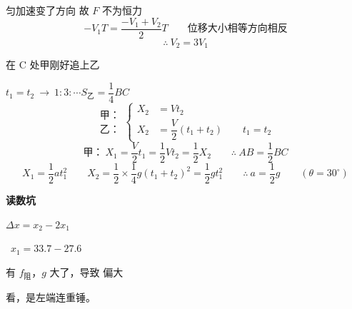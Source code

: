 匀加速\quad {}变了方向 故 $F$ 不为恒力
\[ -V_1T=\dfrac{-V_1+V_2}{2}T\qquad\text{位移大小相等方向相反} \]
\[ \therefore\ V_2=3V_1 \]
\begin{problem}
在 C 处甲刚好追上乙
\begin{solution}
$t_1=t_2\ \to\ 1:3:\cdots$\qquad $S_{\text{乙}}=\dfrac14BC$
\[
\begin{matrix}\text{甲：}\\ \text{乙：}\end{matrix}
\left\{\begin{aligned}
X_2&=Vt_2\\
X_2&=\dfrac{V}{2}(t_1+t_2)\qquad t_1=t_2
\end{aligned}\right.
\]
\[ \text{甲：}\ X_1=\dfrac{V}{2}t_1=\dfrac12Vt_2=\dfrac12X_2\qquad \therefore\ AB=\dfrac12BC \]
\[ X_1=\dfrac12at_1^2\qquad X_2=\dfrac12\times\dfrac14g(t_1+t_2)^2=\dfrac12gt_1^2\qquad \therefore\ a=\dfrac12g\qquad(\theta=30^\circ) \]
\end{solution}
\end{problem}
\textbf{读数坑}


$\Delta x=x_2-2x_1$

\ $x_1=33.7-27.6$

有 $f_{\text{阻}}$，$g$ 大了，导致  偏大%

看，是左端连重锤。
